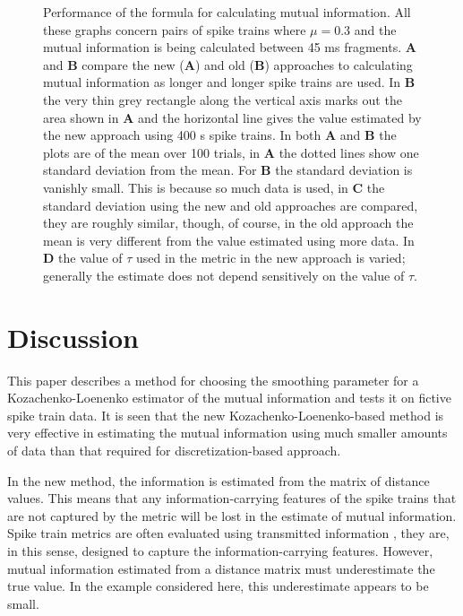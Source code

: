 \documentclass[12pt]{article}
\begin{document}
\begin{figure}[tp]
\begin{center}

\end{center}
\caption{Performance of the formula for calculating mutual
  information. All these graphs concern pairs of spike trains where
  $\mu=0.3$ and the mutual information is being calculated between
  45 ms fragments. \textbf{A} and \textbf{B} compare the new
  (\textbf{A}) and old (\textbf{B}) approaches to calculating mutual
  information as longer and longer spike trains are used. In
  \textbf{B} the very thin grey rectangle along the vertical axis
  marks out the area shown in \textbf{A} and the horizontal line gives
  the value estimated by the new approach using 400 s spike trains. In
  both \textbf{A} and \textbf{B} the plots are of the mean over 100
  trials, in \textbf{A} the dotted lines show one standard deviation
  from the mean. For \textbf{B} the standard deviation is vanishly
  small. This is because so much data is used, in \textbf{C} the
  standard deviation using the new and old approaches are compared,
  they are roughly similar, though, of course, in the old approach the
  mean is very different from the value estimated using more data. In
  \textbf{D} the value of $\tau$ used in the metric in the new
  approach is varied; generally the estimate does not depend
  sensitively on the value of $\tau$. \label{fig_length_sweep}}
\end{figure}


\section{Discussion}

This paper describes a method for choosing the smoothing parameter for
a Kozachenko-Loenenko estimator of the mutual information and tests it
on fictive spike train data. It is seen that the new
Kozachenko-Loenenko-based method is very effective in estimating the
mutual information using much smaller amounts of data than that
required for discretization-based approach. 

In the new method, the information is estimated from the matrix of
distance values. This means that any information-carrying features of
the spike trains that are not captured by the metric will be lost in
the estimate of mutual information. Spike train metrics are often
evaluated using transmitted information
\citep{VictorPurpura1996,HoughtonVictor2010}, they are, in this sense,
designed to capture the information-carrying features. However, mutual
information estimated from a distance matrix must underestimate the true
value. In the example considered here, this underestimate appears to
be small.
\end{document}
